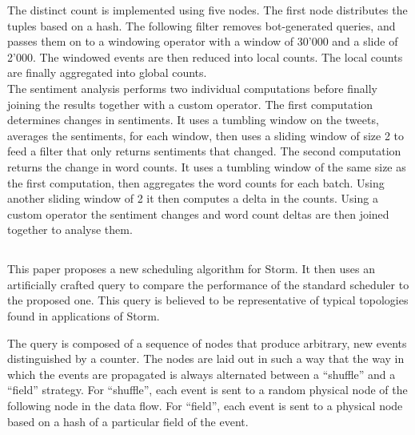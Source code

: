 
The distinct count is implemented using five nodes. The first node distributes the tuples based on a hash. The following filter removes bot-generated queries, and passes them on to a windowing operator with a window of 30'000 and a slide of 2'000. The windowed events are then reduced into local counts. The local counts are finally aggregated into global counts. \\

The sentiment analysis performs two individual computations before finally joining the results together with a custom operator. The first computation determines changes in sentiments. It uses a tumbling window on the tweets, averages the sentiments, for each window, then uses a sliding window of size 2 to feed a filter that only returns sentiments that changed. The second computation returns the change in word counts. It uses a tumbling window of the same size as the first computation, then aggregates the word counts for each batch. Using another sliding window of 2 it then computes a delta in the counts. Using a custom operator the sentiment changes and word count deltas are then joined together to analyse them.

\subsection{}
This paper proposes a new scheduling algorithm for Storm. It then uses an artificially crafted query to compare the performance of the standard scheduler to the proposed one. This query is believed to be representative of typical topologies found in applications of Storm.\\


The query is composed of a sequence of nodes that produce arbitrary, new events distinguished by a counter. The nodes are laid out in such a way that the way in which the events are propagated is always alternated between a ``shuffle'' and a ``field'' strategy. For ``shuffle'', each event is sent to a random physical node of the following node in the data flow. For ``field'', each event is sent to a physical node based on a hash of a particular field of the event.


